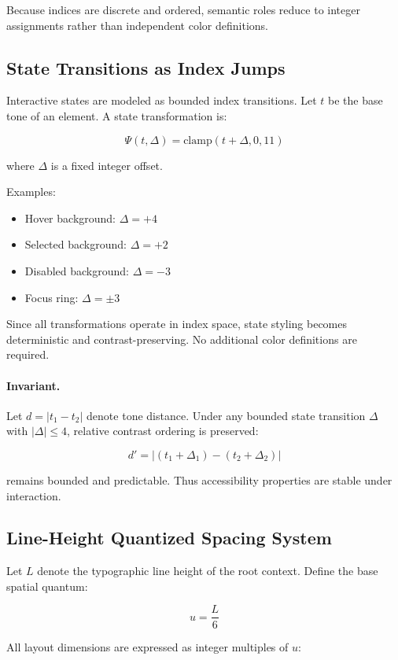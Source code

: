 Because indices are discrete and ordered,
semantic roles reduce to integer assignments rather than
independent color definitions.

\subsection{State Transitions as Index Jumps}

Interactive states are modeled as bounded index transitions.
Let $t$ be the base tone of an element. A state transformation is:

\[
\Psi(t, \Delta) = \text{clamp}(t + \Delta, 0, 11)
\]

where $\Delta$ is a fixed integer offset.

Examples:

\begin{itemize}
    \item Hover background: $\Delta = +4$
    \item Selected background: $\Delta = +2$
    \item Disabled background: $\Delta = -3$
    \item Focus ring: $\Delta = \pm 3$
\end{itemize}

Since all transformations operate in index space,
state styling becomes deterministic and contrast-preserving.
No additional color definitions are required.

\paragraph{Invariant.}

Let $d = |t_1 - t_2|$ denote tone distance.
Under any bounded state transition $\Delta$ with
$|\Delta| \leq 4$, relative contrast ordering is preserved:

\[
d' = |(t_1 + \Delta_1) - (t_2 + \Delta_2)|
\]

remains bounded and predictable.
Thus accessibility properties are stable under interaction.

\subsection{Line-Height Quantized Spacing System}

Let $L$ denote the typographic line height of the root context.
Define the base spatial quantum:

\[
u = \frac{L}{6}
\]

All layout dimensions are expressed as integer multiples of $u$:

